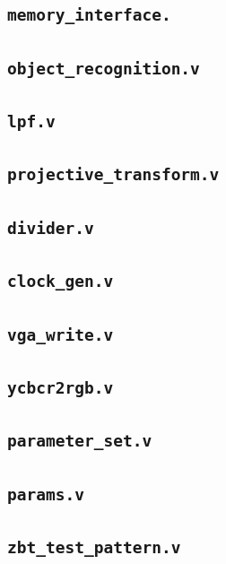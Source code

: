 \documentclass[10pt]{article}
\begin{document}

\subsection{{\tt memory\_interface.}}
	  	

	  	
\subsection{{\tt object\_recognition.v}}
	  	

	  	
\subsection{{\tt lpf.v}}
	  	

	  	
\subsection{{\tt projective\_transform.v}}
	  	

	  	
\subsection{{\tt divider.v}}
	  	

	  	
\subsection{{\tt clock\_gen.v}}

	  	
\subsection{{\tt vga\_write.v}}
	  	

	  	
\subsection{{\tt ycbcr2rgb.v}}
	  	

	  	
\subsection{{\tt parameter\_set.v}}	  	

\subsection{{\tt params.v}}	  	
	  	
\subsection{{\tt zbt\_test\_pattern.v}}  	

\end{document}

